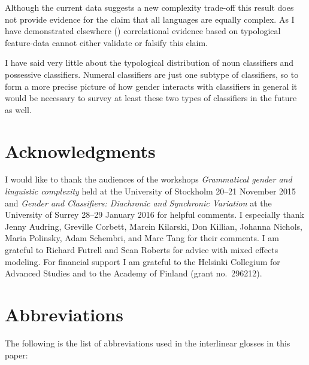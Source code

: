 \documentclass[output=collectionpaper]{langsci/langscibook}
\begin{document}
Although the current data suggests a new complexity trade-off this result does not provide evidence for the claim that all languages are equally complex. As I have demonstrated elsewhere (\citealt{Sinnemaeki2014a}) correlational evidence based on typological feature-data cannot either validate or falsify this claim.

I have said very little about the typological distribution of noun classifiers and possessive classifiers. Numeral classifiers are just one subtype of classifiers, so to form a more precise picture of how gender interacts with classifiers in general it would be necessary to survey at least these two types of classifiers in the future as well.

\section*{Acknowledgments}

I would like to thank the audiences of the workshops \textit{Grammatical gender and linguistic complexity} held at the University of Stockholm 20--21 November 2015 and \textit{Gender and Classifiers: Diachronic and Synchronic Variation} at the University of Surrey 28--29 January 2016 for helpful comments. I especially thank Jenny Audring, Greville Corbett, Marcin Kilarski, Don Killian, Johanna Nichols, Maria Polinsky, Adam Schembri, and Marc Tang for their comments. I am grateful to Richard Futrell and Sean Roberts for advice with mixed effects modeling. For financial support I am grateful to the Helsinki Collegium for Advanced Studies and to the Academy of Finland (grant no.~296212).

\section*{Abbreviations}

The following is the list of abbreviations used in the interlinear glosses in this paper:
\medskip
\end{document}
